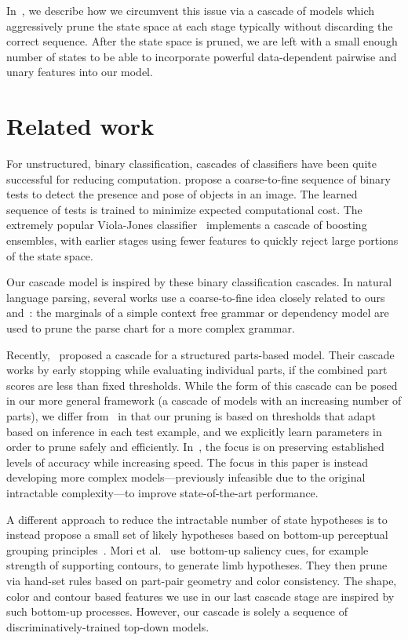 In~, we describe how we circumvent this issue via a cascade of 
models which aggressively prune the state space at each stage typically without 
discarding the correct sequence.  After the state space is pruned, we are left 
with a small enough number of states to be able to incorporate powerful 
data-dependent pairwise and unary features into our model.


\section{Related work}
For unstructured, binary classification, cascades of classifiers have been 
quite successful for reducing computation.  \citet{geman2001} propose a 
coarse-to-fine sequence of binary tests to detect the presence and pose of 
objects in an image.  The learned sequence of tests is trained to minimize 
expected computational cost.  The extremely popular Viola-Jones 
classifier~\citep{viola02} implements a cascade of boosting ensembles, with 
earlier stages using fewer features to quickly reject large portions of the 
state space.

Our cascade model is inspired by these binary classification cascades. In 
natural language parsing, several works \citep{carreras2008tag,petrov:PhD} use 
a coarse-to-fine idea closely related to ours and~\citet{geman2001}: the 
marginals of a simple context free grammar or dependency model are used to 
prune the parse chart for a more complex grammar.

Recently,~\citet{pff-cascade} proposed a cascade for a structured parts-based 
model.  Their cascade works by early stopping while evaluating individual 
parts, if the combined part scores are less than fixed thresholds.  While the 
form of this cascade can be posed in our more general framework (a cascade of 
models with an increasing number of parts), we differ from~\citet{pff-cascade} 
in that our pruning is based on thresholds that adapt based on inference in 
each test example, and we explicitly learn parameters in order to prune safely 
and efficiently. In~\citet{geman2001,viola02,pff-cascade}, the focus is on 
preserving established levels of accuracy while increasing speed.  The focus in 
this paper is instead developing more complex models---previously infeasible 
due to the original intractable complexity---to improve state-of-the-art 
performance.

A different approach to reduce the intractable number of state hypotheses is to instead propose a small set of likely hypotheses based on bottom-up perceptual grouping principles~\cite{mori04,Srinivasan07}.  Mori et al.~\cite{mori04} use bottom-up saliency cues, for example strength of supporting contours, to generate limb hypotheses.  They then prune via hand-set rules based on part-pair geometry and color consistency. The shape, color and contour based features we use in our last cascade stage are inspired by such bottom-up processes.  However, our cascade is solely a sequence of discriminatively-trained top-down models.




